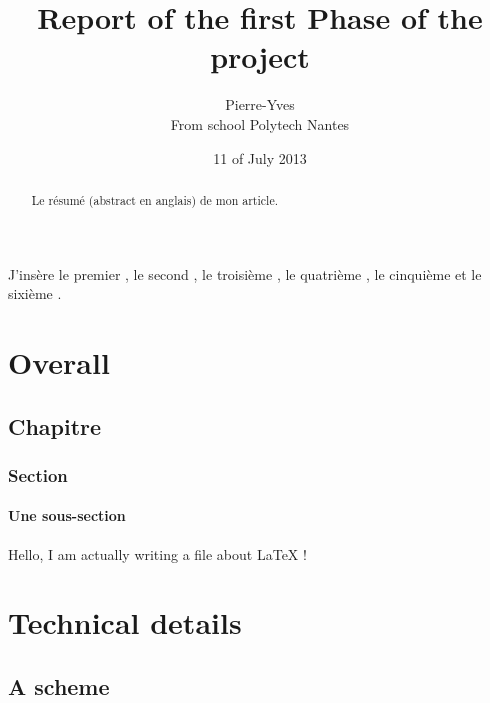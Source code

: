 \documentclass{report}
\title{Report of the first Phase of the project}
\author{Pierre-Yves \bsc{Hervo} \\From school Polytech Nantes}
\date{11\up{th} of July 2013}
\begin{document}
\maketitle

\begin{abstract}
Le résumé (abstract en anglais) de mon article.
\end{abstract}
  
\tableofcontents

J'insère le premier \cite{ref}, le second \cite{ref2}, le troisième \cite{ref3}, le quatrième \cite{ref4}, le cinquième \cite{ref5} et le sixième \cite{ref6}.


\part{Overall}
\chapter{Chapitre}
\section{Section}
\subsection{Une sous-section}
Hello, I am actually writing a file about LaTeX !
\part{Technical details}
\appendix
\chapter{A scheme}

\listoffigures
\listoftables

\end{document}
